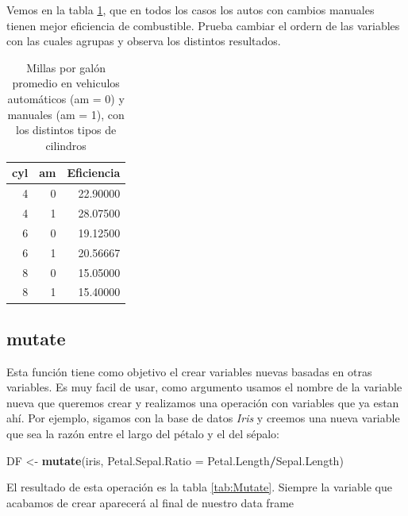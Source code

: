 \documentclass[]{book}
\newenvironment{Shaded}{\begin{snugshade}}{\end{snugshade}}
\newcommand{\DataTypeTok}[1]{\textcolor[rgb]{0.13,0.29,0.53}{#1}}
\newcommand{\KeywordTok}[1]{\textcolor[rgb]{0.13,0.29,0.53}{\textbf{#1}}}
\newcommand{\NormalTok}[1]{#1}
\newcommand{\OperatorTok}[1]{\textcolor[rgb]{0.81,0.36,0.00}{\textbf{#1}}}
\newcommand{\StringTok}[1]{\textcolor[rgb]{0.31,0.60,0.02}{#1}}
\begin{document}
Vemos en la tabla \ref{tab:Eficienciatab}, que en todos los casos los
autos con cambios manuales tienen mejor eficiencia de combustible.
Prueba cambiar el ordern de las variables con las cuales agrupas y
observa los distintos resultados.

\begin{table}

\caption{\label{tab:Eficienciatab}Millas por galón promedio en vehiculos automáticos (am = 0) y manuales (am = 1), con los distintos tipos de cilindros}
\centering
\begin{tabular}[t]{rrr}
\toprule
cyl & am & Eficiencia\\
\midrule
4 & 0 & 22.90000\\
4 & 1 & 28.07500\\
6 & 0 & 19.12500\\
6 & 1 & 20.56667\\
8 & 0 & 15.05000\\
8 & 1 & 15.40000\\
\bottomrule
\end{tabular}
\end{table}

\hypertarget{mutate}{%
\subsection{mutate}\label{mutate}}

Esta función tiene como objetivo el crear variables nuevas basadas en
otras variables. Es muy facil de usar, como argumento usamos el nombre
de la variable nueva que queremos crear y realizamos una operación con
variables que ya estan ahí. Por ejemplo, sigamos con la base de datos
\emph{Iris} y creemos una nueva variable que sea la razón entre el largo
del pétalo y el del sépalo:

\begin{Shaded}
\begin{Highlighting}[]
\NormalTok{DF <-}\StringTok{ }\KeywordTok{mutate}\NormalTok{(iris, }\DataTypeTok{Petal.Sepal.Ratio =}\NormalTok{ Petal.Length}\OperatorTok{/}\NormalTok{Sepal.Length)}
\end{Highlighting}
\end{Shaded}

El resultado de esta operación es la tabla \ref{tab:Mutate}. Siempre la
variable que acabamos de crear aparecerá al final de nuestro data frame
\end{document}
